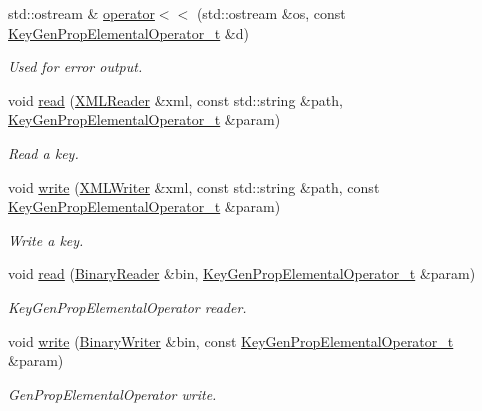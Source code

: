 \begin{DoxyCompactItemize}
std\+::ostream \& \mbox{\hyperlink{namespaceHadron_a6bcf2658e0321428eeedf53a15a894aa}{operator$<$$<$}} (std\+::ostream \&os, const \mbox{\hyperlink{structHadron_1_1KeyGenPropElementalOperator__t}{Key\+Gen\+Prop\+Elemental\+Operator\+\_\+t}} \&d)
\begin{DoxyCompactList}\small\item\em Used for error output. \end{DoxyCompactList}\item 
void \mbox{\hyperlink{namespaceHadron_a9c6649bbe7b32cbc5fcbf8ebbf17d987}{read}} (\mbox{\hyperlink{classADATXML_1_1XMLReader}{X\+M\+L\+Reader}} \&xml, const std\+::string \&path, \mbox{\hyperlink{structHadron_1_1KeyGenPropElementalOperator__t}{Key\+Gen\+Prop\+Elemental\+Operator\+\_\+t}} \&param)
\begin{DoxyCompactList}\small\item\em Read a key. \end{DoxyCompactList}\item 
void \mbox{\hyperlink{namespaceHadron_a67dc2040c75fb33a942bc5a59243c4c3}{write}} (\mbox{\hyperlink{classADATXML_1_1XMLWriter}{X\+M\+L\+Writer}} \&xml, const std\+::string \&path, const \mbox{\hyperlink{structHadron_1_1KeyGenPropElementalOperator__t}{Key\+Gen\+Prop\+Elemental\+Operator\+\_\+t}} \&param)
\begin{DoxyCompactList}\small\item\em Write a key. \end{DoxyCompactList}\item 
void \mbox{\hyperlink{namespaceHadron_ac6d19c651cf61c129b5cf86c15d13ab5}{read}} (\mbox{\hyperlink{classADATIO_1_1BinaryReader}{Binary\+Reader}} \&bin, \mbox{\hyperlink{structHadron_1_1KeyGenPropElementalOperator__t}{Key\+Gen\+Prop\+Elemental\+Operator\+\_\+t}} \&param)
\begin{DoxyCompactList}\small\item\em Key\+Gen\+Prop\+Elemental\+Operator reader. \end{DoxyCompactList}\item 
void \mbox{\hyperlink{namespaceHadron_af1d6496318c689e52be27a9f842ccc2d}{write}} (\mbox{\hyperlink{classADATIO_1_1BinaryWriter}{Binary\+Writer}} \&bin, const \mbox{\hyperlink{structHadron_1_1KeyGenPropElementalOperator__t}{Key\+Gen\+Prop\+Elemental\+Operator\+\_\+t}} \&param)
\begin{DoxyCompactList}\small\item\em Gen\+Prop\+Elemental\+Operator write. \end{DoxyCompactList}\item 

\end{DoxyCompactItemize}
